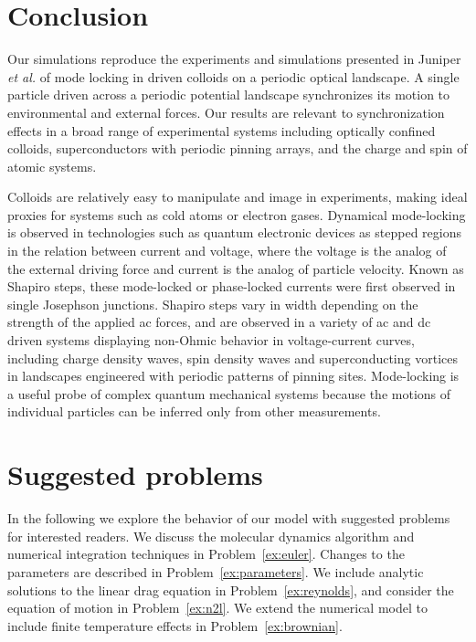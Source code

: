 \documentclass[preprint,showpacs,preprintnumbers,amsmath,amssymb,aps,prb]{revtex4-1}
\theoremstyle{remark}
\begin{document}
\section{Conclusion}
\label{sec:conclusion}	


Our simulations reproduce the experiments and simulations presented in 
Juniper {\it et al.} \cite{Juniper2015, Juniper2017}
of 
mode locking in
driven colloids on a
periodic optical landscape.
A single particle driven across a periodic potential landscape 
synchronizes its motion 
to environmental and external forces. 
Our results are relevant 
to synchronization effects
in a broad range of experimental systems
including optically confined colloids,
superconductors with periodic pinning arrays, 
and the charge and spin of atomic systems.

Colloids are 
relatively easy to 
manipulate and image in experiments,
making ideal proxies 
for systems 
such as cold atoms or electron gases.\cite{Grier2003}
Dynamical mode-locking 
is 
observed in technologies such as 
quantum electronic
devices as 
stepped regions in the relation between current and voltage,
where the voltage is the analog of the external driving force
and current is the analog of particle velocity.
Known as Shapiro steps, 
these mode-locked or phase-locked currents
were first
observed in single Josephson junctions\cite{Shapiro1963, Golubov2004}.
Shapiro steps vary in width depending on the strength of the
applied ac forces,
and are observed in a variety of ac and dc driven systems
displaying
non-Ohmic behavior in voltage-current curves,
including
charge density waves, spin density waves
and superconducting vortices in landscapes 
engineered with periodic patterns of pinning sites.\cite{Reichhardt2000}
Mode-locking is a useful probe 
of complex quantum mechanical systems
because the motions of individual particles can  be inferred only
from other measurements.

\section{Suggested problems}
\label{sec:problems}	

In the following
we explore the behavior of our model
with suggested problems for interested readers.
We discuss the molecular dynamics algorithm
and
numerical integration techniques in Problem~\ref{ex:euler}.
Changes to the parameters are described in 
Problem~\ref{ex:parameters}.
We include analytic solutions to  the 
linear drag equation in Problem~\ref{ex:reynolds}, and consider
the equation of motion in Problem~\ref{ex:n2l}.
We extend the numerical model  
to include finite temperature effects
in Problem~\ref{ex:brownian}.
\end{document}
